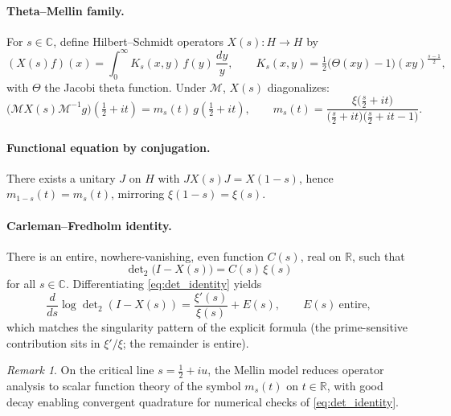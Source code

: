 \documentclass[11pt]{article}
\numberwithin{equation}{section}
\theoremstyle{definition}
\theoremstyle{remark}
\newtheorem{remark}[theorem]{Remark}
\newcommand{\1}{\mathbbm{1}}
\begin{document}
\paragraph{Theta–Mellin family.}
For \(s\in\mathbb{C}\), define Hilbert–Schmidt operators \(X(s):H\to H\) by
\begin{equation}
(X(s)f)(x)=\int_0^\infty K_s(x,y)\,f(y)\,\frac{dy}{y},\qquad
K_s(x,y)=\tfrac12\big(\Theta(xy)-1\big)(xy)^{\frac{s-1}{2}},
\end{equation}
with \(\Theta\) the Jacobi theta function. Under \(\mathcal{M}\), \(X(s)\) diagonalizes:
\begin{equation}
\big(\mathcal{M}X(s)\mathcal{M}^{-1}g\big)\!\left(\tfrac12+it\right)=m_s(t)\,g\!\left(\tfrac12+it\right),\qquad
m_s(t)=\frac{\xi\!\big(\frac{s}{2}+it\big)}{\big(\frac{s}{2}+it\big)\big(\frac{s}{2}+it-1\big)}.
\end{equation}

\paragraph{Functional equation by conjugation.}
There exists a unitary \(J\) on \(H\) with \(JX(s)J=X(1-s)\), hence \(m_{1-s}(t)=m_s(t)\), mirroring \(\xi(1-s)=\xi(s)\).

\paragraph{Carleman–Fredholm identity.}
There is an entire, nowhere-vanishing, even function \(C(s)\), real on \(\mathbb{R}\), such that
\begin{equation}
\boxed{\ \ \det\nolimits_{2}\!\big(I-X(s)\big)=C(s)\,\xi(s)\ \ }
\label{eq:det_identity}
\end{equation}
for all \(s\in\mathbb{C}\).
Differentiating \eqref{eq:det_identity} yields
\begin{equation}
\frac{d}{ds}\log\det\nolimits_{2}(I-X(s))
=\frac{\xi'(s)}{\xi(s)}+E(s),\qquad E(s)\ \text{entire},
\end{equation}
which matches the singularity pattern of the explicit formula (the prime-sensitive contribution sits in \(\xi'/\xi\); the remainder is entire).

\begin{remark}
On the critical line \(s=\tfrac12+iu\), the Mellin model reduces operator analysis to scalar function theory of the symbol \(m_s(t)\) on \(t\in\mathbb{R}\),
with good decay enabling convergent quadrature for numerical checks of \eqref{eq:det_identity}.
\end{remark}
\end{document}
